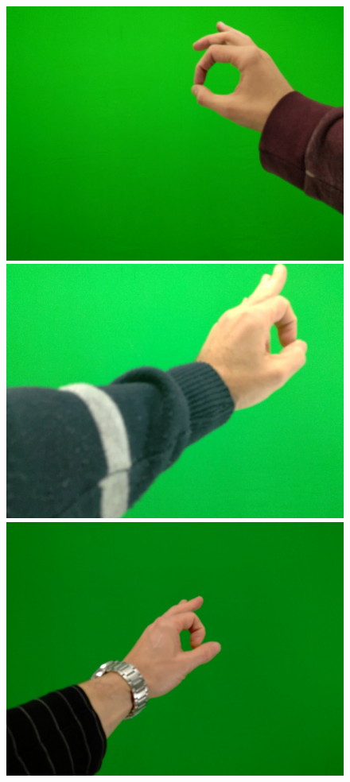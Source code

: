 \begin{figure}[htb]
\begin{minipage}[c]{0.19\linewidth}
      \includegraphics[width=0.95\linewidth]{figures/g2-2.jpg}
   \end{minipage} 
   \begin{minipage}[c]{0.19\linewidth}
      \includegraphics[width=0.95\linewidth]{figures/g2-4.jpg}
   \end{minipage} 
   \begin{minipage}[c]{0.19\linewidth}
      \includegraphics[width=0.95\linewidth]{figures/g2-6.jpg}

\end{minipage}
\end{figure}
